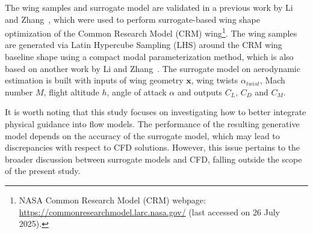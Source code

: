 The wing samples and surrogate model are validated in a previous work by Li and Zhang~\cite{aa.Li2021b}, which were used to perform surrogate-based wing shape optimization of the Common Research Model (CRM) wing\footnote{NASA Common Research Model (CRM) webpage: \url{https://commonresearchmodel.larc.nasa.gov/} (last accessed on 26 July 2025).}. The wing samples are generated via Latin Hypercube Sampling (LHS) around the CRM wing baseline shape using a compact modal parameterization method, which is also based on another work by Li and Zhang~\cite{aa.Li2021c}. The surrogate model on aerodynamic estimation is built with inputs of wing geometry $\mathbf{x}$, wing twists $\alpha_{twist}$, Mach number $M$, flight altitude $h$, angle of attack $\alpha$ and outputs $C_{L}$, $C_{D}$ and $C_{M}$. 

It is worth noting that this study focuses on investigating how to better integrate physical guidance into flow models. The performance of the resulting generative model depends on the accuracy of the surrogate model, which may lead to discrepancies with respect to CFD solutions. However, this issue pertains to the broader discussion between surrogate models and CFD, falling outside the scope of the present study.


